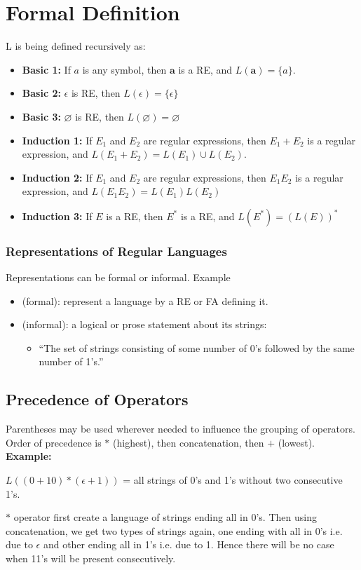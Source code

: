 \documentclass{report}
\begin{document}
 \section{Formal Definition}
    L is being defined recursively as:
    \begin{itemize}
        \item \textbf{Basic 1:}  If $a$ is any symbol, then $\textbf{a}$ is a RE, and $L(\textbf{a}) = \{a\}$.
        \item \textbf{Basic 2: } $\epsilon$ is RE, then $L(\epsilon) = \{\epsilon\}$
        \item \textbf{Basic 3: } $\varnothing$ is RE, then $L(\varnothing) = \varnothing$
        \item \textbf{Induction 1:}  If $E_1$ and $E_2$ are regular expressions, then $E_1+E_2$ is a regular expression, and $L(E_1+E_2) = L(E_1)\cup L(E_2)$.
        \item \textbf{Induction 2:} If $E_1$ and $E_2$ are regular expressions, then $E_1E_2$ is a regular expression, and $L(E_1E_2) = L(E_1)L(E_2)$
        \item \textbf{Induction 3:} If $E$ is a RE, then $E^*$ is a RE, and $L(E^*)=(L(E))^*$
    \end{itemize}
    
\subsubsection{Representations of Regular Languages}
Representations can be formal or informal. Example 
\begin{itemize}
    \item (formal): represent a language by a RE or FA defining it.
    \item (informal): a logical or prose statement about its strings:
    \begin{itemize}
        \item “The set of strings consisting of some number of 0’s followed by the same number of 1’s.”
    \end{itemize}
\end{itemize} 

\subsection{Precedence of Operators}
    Parentheses may be used wherever needed to influence the grouping of operators. Order of precedence is $*$ (highest), then concatenation, then $+$ (lowest). \textbf{Example:} \par
    $L((0+10)*(\epsilon+1))$ = all strings of 0’s and 1’s without two consecutive 1’s.
    \par $*$ operator first create a language of strings ending all in 0's. Then using concatenation, we get two types of strings again, one ending with all in 0's i.e. due to $\epsilon$ and other ending all in 1's i.e. due to 1. Hence there will be no case when 11's will be present consecutively.  
\end{document}
